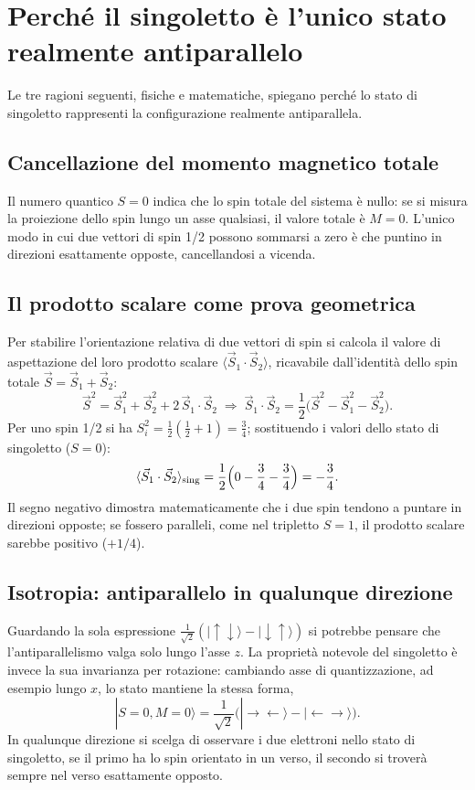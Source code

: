 \documentclass[11pt,a4paper]{article}
\begin{document}
\section{Perch\'e il singoletto \`e l'unico stato realmente antiparallelo}

Le tre ragioni seguenti, fisiche e matematiche, spiegano perch\'e lo stato di
singoletto rappresenti la configurazione realmente antiparallela.

\subsection{Cancellazione del momento magnetico totale}

Il numero quantico $S=0$ indica che lo spin totale del sistema \`e nullo: se si misura
la proiezione dello spin lungo un asse qualsiasi, il valore totale \`e $M=0$. L'unico
modo in cui due vettori di spin 1/2 possono sommarsi a zero \`e che puntino in
direzioni esattamente opposte, cancellandosi a vicenda.

\subsection{Il prodotto scalare come prova geometrica}

Per stabilire l'orientazione relativa di due vettori di spin si calcola il valore di
aspettazione del loro prodotto scalare $\langle\vec S_1\cdot\vec S_2\rangle$, ricavabile
dall'identit\`a dello spin totale $\vec S=\vec S_1+\vec S_2$:
$$\vec S^2 = \vec S_1^2+\vec S_2^2+2\,\vec S_1\cdot\vec S_2 \;\Longrightarrow\; \vec S_1\cdot\vec S_2 = \frac12\Big(\vec S^2-\vec S_1^2-\vec S_2^2\Big).$$
Per uno spin 1/2 si ha $S_i^2=\tfrac12(\tfrac12+1)=\tfrac34$; sostituendo i valori
dello stato di singoletto ($S=0$):
$$\langle\vec S_1\cdot\vec S_2\rangle_{\rm sing}=\frac12\Big(0-\frac34-\frac34\Big)=-\frac34.$$
Il segno negativo dimostra matematicamente che i due spin tendono a puntare in
direzioni opposte; se fossero paralleli, come nel tripletto $S=1$, il prodotto scalare
sarebbe positivo ($+1/4$).

\subsection{Isotropia: antiparallelo in qualunque direzione}

Guardando la sola espressione $\tfrac1{\sqrt2}(|\!\uparrow\downarrow\rangle-|\!\downarrow\uparrow\rangle)$
si potrebbe pensare che l'antiparallelismo valga solo lungo l'asse $z$. La propriet\`a
notevole del singoletto \`e invece la sua invarianza per rotazione: cambiando asse di
quantizzazione, ad esempio lungo $x$, lo stato mantiene la stessa forma,
$$|S=0,M=0\rangle=\frac1{\sqrt2}\big(|\!\rightarrow\leftarrow\rangle-|\!\leftarrow\rightarrow\rangle\big).$$
In qualunque direzione si scelga di osservare i due elettroni nello stato di
singoletto, se il primo ha lo spin orientato in un verso, il secondo si trover\`a
sempre nel verso esattamente opposto.
\end{document}
